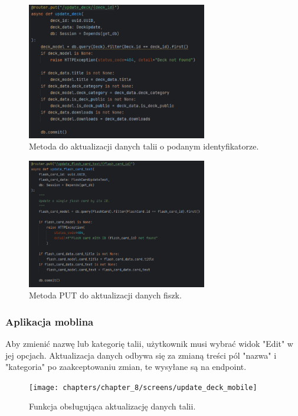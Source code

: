 \begin{figure}[H]
    \centering
    \includegraphics[width=0.7\textwidth]{chapters/chapter_8/screens/update_deck_backend}
    \caption{Metoda do aktualizacji danych talii o podanym identyfikatorze.}
    \label{img:update_deck_backend}
\end{figure}

\begin{figure}[H]
    \centering
    \includegraphics[width=0.7\textwidth]{chapters/chapter_8/screens/update_flash_card_text_backend}
    \caption{Metoda PUT do aktualizacji danych fiszk.}
    \label{img:update_flash_card_backend}
\end{figure}

\subsubsection{Aplikacja moblina}

Aby zmienić nazwę lub kategorię talii, użytkownik musi wybrać widok "Edit" w jej opcjach. Aktualizacja danych odbywa się za zmianą treści pól "nazwa" i "kategoria" po zaakceptowaniu zmian, te wysyłane są na endpoint.

\begin{figure}[H]
    \centering
    \texttt{[image: chapters/chapter\_8/screens/update\_deck\_mobile]}
    \caption{Funkcja obsługująca aktualizację danych talii.}
    \label{img:update_deck_mobile}
\end{figure}

